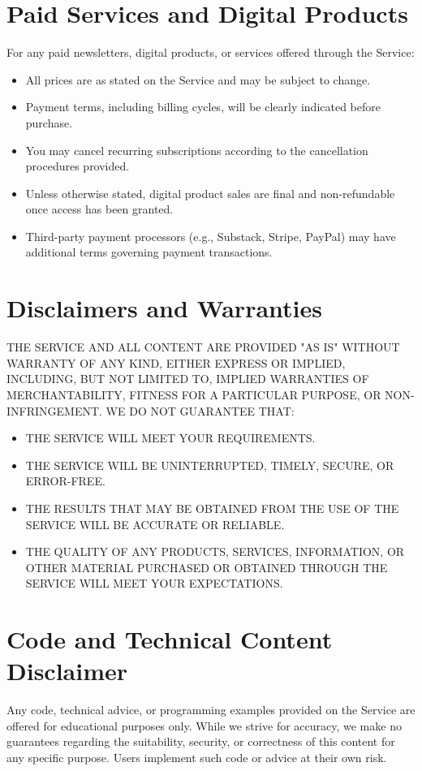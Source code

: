 \documentclass[11pt]{article}
\begin{document}
\section{Paid Services and Digital Products}
For any paid newsletters, digital products, or services offered through the Service:
\begin{itemize}
  \item All prices are as stated on the Service and may be subject to change.
  \item Payment terms, including billing cycles, will be clearly indicated before purchase.
  \item You may cancel recurring subscriptions according to the cancellation procedures provided.
  \item Unless otherwise stated, digital product sales are final and non-refundable once access has been granted.
  \item Third-party payment processors (e.g., Substack, Stripe, PayPal) may have additional terms governing payment transactions.
\end{itemize}

\section{Disclaimers and Warranties}
THE SERVICE AND ALL CONTENT ARE PROVIDED "AS IS" WITHOUT WARRANTY OF ANY KIND, EITHER EXPRESS OR IMPLIED, INCLUDING, BUT NOT LIMITED TO, IMPLIED WARRANTIES OF MERCHANTABILITY, FITNESS FOR A PARTICULAR PURPOSE, OR NON-INFRINGEMENT. WE DO NOT GUARANTEE THAT:
\begin{itemize}
  \item THE SERVICE WILL MEET YOUR REQUIREMENTS.
  \item THE SERVICE WILL BE UNINTERRUPTED, TIMELY, SECURE, OR ERROR-FREE.
  \item THE RESULTS THAT MAY BE OBTAINED FROM THE USE OF THE SERVICE WILL BE ACCURATE OR RELIABLE.
  \item THE QUALITY OF ANY PRODUCTS, SERVICES, INFORMATION, OR OTHER MATERIAL PURCHASED OR OBTAINED THROUGH THE SERVICE WILL MEET YOUR EXPECTATIONS.
\end{itemize}

\section{Code and Technical Content Disclaimer}
Any code, technical advice, or programming examples provided on the Service are offered for educational purposes only. While we strive for accuracy, we make no guarantees regarding the suitability, security, or correctness of this content for any specific purpose. Users implement such code or advice at their own risk.
\end{document}
